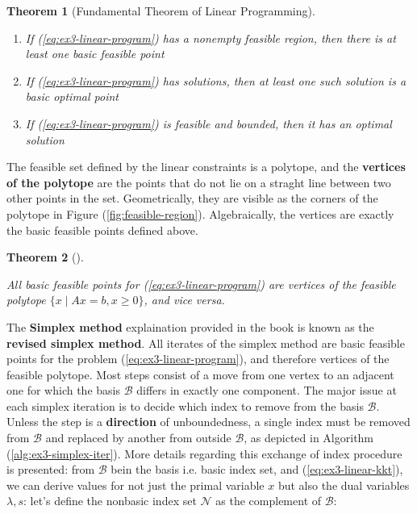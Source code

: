 \documentclass[unicode,11pt,a4paper,oneside,numbers=endperiod,openany]{scrartcl}
\newtheorem{theorem}{Theorem}[section]
\newcommand{\myth}[3]{
    \begin{theorem}[#1] 
        \label{#2} 
        #3 
    \end{theorem}
}
\begin{document}
\myth{Fundamental Theorem of Linear Programming}{th:ex3-linear-programming}{
    \hfill
    \begin{enumerate}
        \item If (\ref{eq:ex3-linear-program}) has a nonempty feasible region,
              then there is at least one basic feasible point
        \item If (\ref{eq:ex3-linear-program}) has solutions,
              then at least one such solution is a basic optimal point
        \item If (\ref{eq:ex3-linear-program}) is feasible and bounded,
              then it has an optimal solution
    \end{enumerate}
}

The feasible set defined by the linear constraints is a polytope,
and the \textbf{vertices of the polytope} are the points that do not lie on a straght line
between two other points in the set.
Geometrically,
they are visible as the corners of the polytope in Figure (\ref{fig:feasible-region}).
Algebraically, the vertices are exactly the basic feasible points defined above.

\myth{}{th:ex3-vertices-polytope}{
    All basic feasible points for (\ref{eq:ex3-linear-program})
    are vertices of the feasible polytope
    \( \{ x \mid Ax = b, x \geq 0 \} \),
    and vice versa.
}

The \textbf{Simplex method} explaination provided in the book
is known as the \textbf{revised simplex method}.
All iterates of the simplex method are basic feasible points
for the problem (\ref{eq:ex3-linear-program}),
and therefore vertices of the feasible polytope.
Most steps consist of a move from one vertex to an adjacent one
for which the basis \( \mathcal{B} \) differs in exactly one component.
The major issue at each simplex iteration is to decide which index to remove from the basis 
\( \mathcal{B} \).
Unless the step is a \textbf{direction} of unboundedness,
a single index must be removed from \( \mathcal{B} \) and replaced by another from outside 
\( \mathcal{B} \), 
as depicted in Algorithm (\ref{alg:ex3-simplex-iter}).
More details regarding this exchange of index procedure is presented:
from \( \mathcal{B} \) bein the basis i.e. basic index set,
and (\ref{eq:ex3-linear-kkt}), 
we can derive values for not just
the primal variable \( x \) but also the dual variables \( \lambda, s \):
let's define the nonbasic index set \( \mathcal{N} \) as the complement of \( \mathcal{B} \):
\end{document}
